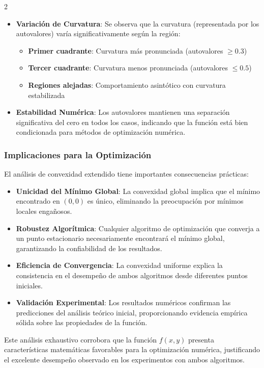 \documentclass[11pt, a4paper, twocolumn]{beamer}
\begin{document}
\begin{multicols}{2}
\begin{itemize}
		\item \textbf{Variación de Curvatura}: Se observa que la curvatura (representada por los autovalores) varía significativamente según la región:
		\begin{itemize}
			\item \textbf{Primer cuadrante}: Curvatura más pronunciada (autovalores $\geq 0.3$)
			\item \textbf{Tercer cuadrante}: Curvatura menos pronunciada (autovalores $\leq 0.5$)
			\item \textbf{Regiones alejadas}: Comportamiento asintótico con curvatura estabilizada
		\end{itemize}
		
		\item \textbf{Estabilidad Numérica}: Los autovalores mantienen una separación significativa del cero en todos los casos, indicando que la función está bien condicionada para métodos de optimización numérica.
	\end{itemize}
	
	\subsubsection{Implicaciones para la Optimización}
	
	El análisis de convexidad extendido tiene importantes consecuencias prácticas:
	
	\begin{itemize}
		\item \textbf{Unicidad del Mínimo Global}: La convexidad global implica que el mínimo encontrado en $(0,0)$ es único, eliminando la preocupación por mínimos locales engañosos.
		
		\item \textbf{Robustez Algorítmica}: Cualquier algoritmo de optimización que converja a un punto estacionario necesariamente encontrará el mínimo global, garantizando la confiabilidad de los resultados.
		
		\item \textbf{Eficiencia de Convergencia}: La convexidad uniforme explica la consistencia en el desempeño de ambos algoritmos desde diferentes puntos iniciales.
		
		\item \textbf{Validación Experimental}: Los resultados numéricos confirman las predicciones del análisis teórico inicial, proporcionando evidencia empírica sólida sobre las propiedades de la función.
	\end{itemize}
\end{multicols}
\newpage
	Este análisis exhaustivo corrobora que la función $f(x,y)$ presenta características matemáticas favorables para la optimización numérica, justificando el excelente desempeño observado en los experimentos con ambos algoritmos.
	\newpage
\end{document}
